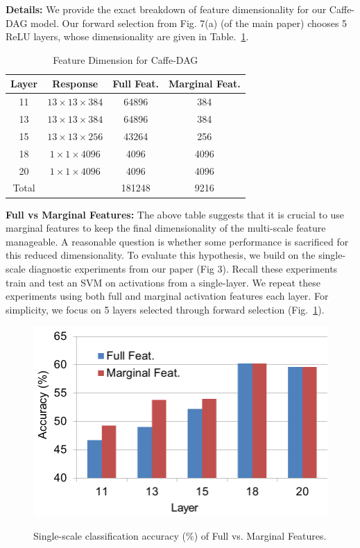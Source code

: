 \documentclass[10pt,twocolumn,letterpaper]{article}
\begin{document}
{\bf Details:} We provide the exact breakdown of feature dimensionality for our Caffe-DAG model. Our forward selection from  Fig. 7(a) (of the main paper) chooses 5 ReLU layers, whose dimensionality are given in Table.~\ref{table:feat_dim}.

\begin{table}[htbp]
\begin{center}
\begin{tabular}{|c|c|c|c|}
\hline
Layer & Response &  Full Feat.& Marginal Feat.\\
\hline
11 & $13\times 13 \times 384$ & 64896 & 384 \\
13 & $13\times 13 \times 384$ & 64896 & 384 \\
15 & $13\times 13 \times 256$ & 43264 & 256 \\
18 & $1\times 1 \times 4096$ & 4096 & 4096 \\
20 & $1\times 1 \times 4096$ & 4096 & 4096 \\
\hline
Total& & 181248 & 9216\\
\hline
\end{tabular}
\end{center}
\caption{Feature Dimension for Caffe-DAG}
\label{table:feat_dim}
\end{table}


{\bf Full vs Marginal Features:} The above table suggests that it is crucial to use marginal features to keep the final dimensionality of the multi-scale feature manageable. A reasonable question is whether some performance is sacrificed for this reduced dimensionality. To evaluate this hypothesis, we build on the single-scale diagnostic experiments from our paper (Fig 3). Recall these experiments train and test an SVM on activations from a single-layer. We repeat these experiments using both full and marginal activation features each layer. For simplicity, we focus on 5 layers selected through forward selection (Fig.~\ref{fig:full_marg}).

\begin{figure}[htbp]
\centering
	{\includegraphics[width=.8\columnwidth]{fig/full_marg.png}}

\caption{Single-scale classification accuracy (\%) of Full vs. Marginal Features.}
\label{fig:full_marg}
\end{figure}
\end{document}
